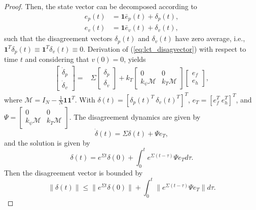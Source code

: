 \begin{proof}
Then, the state vector can be decomposed according to
\begin{align}\label{eq:lct_disagvector}
e_p(t) & = \boldsymbol{1}\bar{e}_p(t) + \delta_p(t),  \nonumber \\
e_v(t) & = \boldsymbol{1}\bar{e}_v(t) + \delta_v(t),
\end{align}
such that the disagreement vectors $\delta_p(t)$ and $\delta_v(t)$ have zero average, i.e., $\boldsymbol{1}^T \delta_p(t) \equiv \boldsymbol{1}^T \delta_v(t) \equiv 0$. Derivation of  (\ref{eq:lct_disagvector}) with respect to time $t$ and considering that $v(0)=0$, yields
\begin{align}
\begin{bmatrix}
\dot{\delta}_p\\
\dot{\delta}_v
\end{bmatrix}
= &
\Sigma 
\begin{bmatrix}
\delta_p\\
\delta_v
\end{bmatrix}
+
k_T
\begin{bmatrix}
0 & 0\\
k_{\psi} \mathcal{M} & k_T \mathcal{M}
\end{bmatrix}
\begin{bmatrix}
e_f\\
e_h
\end{bmatrix},
\end{align}
where $\mathcal{M} =  I_N -\frac{1}{N} \boldsymbol{1}\boldsymbol{1}^T $.
With $\delta(t) = [\delta_p(t)^T \ \delta_v(t)^T]^T$, $e_T = [e_f^T \ e_h^T]^T$, and $\Psi=\begin{bmatrix}
0 & 0\\
k_{\psi} \mathcal{M} & k_T \mathcal{M}
\end{bmatrix}$. 
The disagreement dynamics are given by
\begin{equation}
\dot{\delta}(t)=  \Sigma\delta(t)+\Psi e_T,
\end{equation}
and the solution is given by
\begin{equation*}
\delta(t)=e^{\Sigma t}\delta(0) +\int_0^t e^{\Sigma (t-\tau)}\Psi e_T d\tau.
\end{equation*} 
Then the disagreement vector is bounded by
\begin{equation*}
\| \delta(t) \| \leq  \| e^{\Sigma t} \delta(0)\| +  \int^{t}_{0} \|  e^{ \Sigma (t - \tau)} \Psi e_T\| d\tau.
\end{equation*}

\end{proof}
